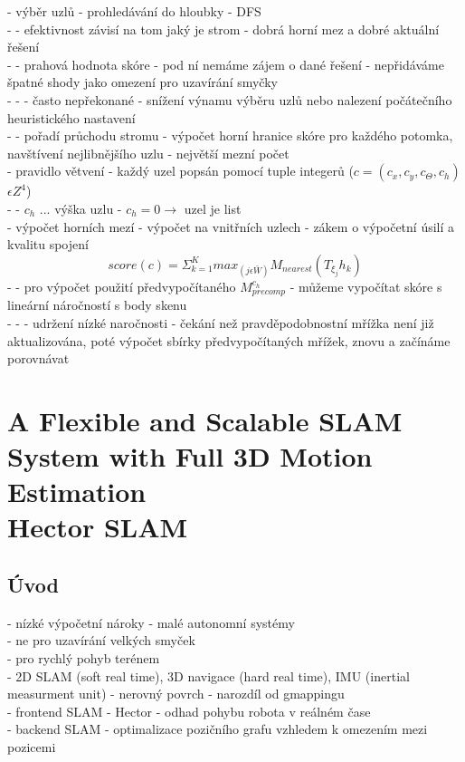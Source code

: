 \documentclass[11pt]{article}
\begin{document}
- výběr uzlů - prohledávání do hloubky - DFS\\
- - efektivnost závisí na tom jaký je strom - dobrá horní mez a dobré aktuální řešení\\
- - prahová hodnota skóre - pod ní nemáme zájem o dané řešení - nepřidáváme špatné shody jako omezení pro uzavírání smyčky\\
- - - často nepřekonané - snížení výnamu výběru uzlů nebo nalezení počátečního heuristického nastavení\\
- - pořadí průchodu stromu - výpočet horní hranice skóre pro každého potomka, navštívení nejlibnějšího uzlu - největší mezní počet\\
- pravidlo větvení - každý uzel popsán pomocí tuple integerů ($c=(c_x,c_y,c_\Theta,c_h)$ $\epsilon Z^4$)\\
- - $c_h$ ... výška uzlu - $c_h=0 \rightarrow$ uzel je list\\
- výpočet horních mezí - výpočet na vnitřních uzlech - zákem o výpočetní úsilí a kvalitu spojení\\
$$score(c)=\Sigma_{k=1}^Kmax_{(j\epsilon \bar{W})}M_{nearest}(T_{\xi_j}h_k)$$
- - pro výpočet použití předvypočítaného $M_{precomp}^{c_h}$ - můžeme vypočítat skóre s lineární náročností s body skenu\\
- - - udržení nízké naročnosti - čekání než pravděpodobnostní mřížka není již aktualizována, poté výpočet sbírky předvypočítaných mřížek, znovu a začínáme porovnávat\\


\newpage

\section{A Flexible and Scalable SLAM System with Full 3D Motion Estimation \\ Hector SLAM}

\subsection{Úvod}
- nízké výpočetní nároky - malé autonomní systémy\\
- ne pro uzavírání velkých smyček\\
- pro rychlý pohyb terénem\\
- 2D SLAM (soft real time), 3D navigace (hard real time), IMU (inertial measurment unit) - nerovný povrch - narozdíl od gmappingu\\
- frontend SLAM - Hector - odhad pohybu robota v reálném čase\\
- backend SLAM - optimalizace pozičního grafu vzhledem k omezením mezi pozicemi\\
\end{document}
